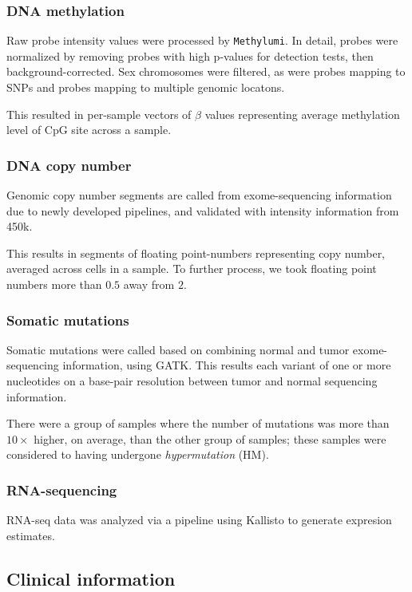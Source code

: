 \subsubsection{DNA methylation}
Raw probe intensity values were processed by
\texttt{Methylumi}\cite{davis_package_2013}. In detail, probes were
normalized by removing probes with high p-values for detection tests,
then background-corrected. Sex chromosomes were filtered, as were
probes mapping to SNPs and probes mapping to multiple genomic
locatons.

This resulted in per-sample vectors of $\beta$ values representing average methylation level
of CpG site across a sample.

\subsubsection{DNA copy number}

Genomic copy number segments are called from exome-sequencing
information due to newly developed pipelines, and validated with
intensity information from 450k.

This results in segments of floating point-numbers representing copy
number, averaged across cells in a sample. To further process, we took
floating point numbers more than $0.5$ away from $2$.

\subsubsection{Somatic mutations}

Somatic mutations were called based on combining normal and tumor
exome-sequencing information, using GATK. This results
each variant of one or more nucleotides on a base-pair resolution
between tumor and normal sequencing information.

There were a group of samples where the number of mutations was more than $10 \times$
higher, on average, than the other group of samples; these samples
were considered to having undergone \textit{hypermutation} (HM). 

\subsubsection{RNA-sequencing}

RNA-seq data was analyzed via a pipeline using
Kallisto\cite{bray_near-optimal_2016} to generate expresion
estimates. 

\subsection{Clinical information}


